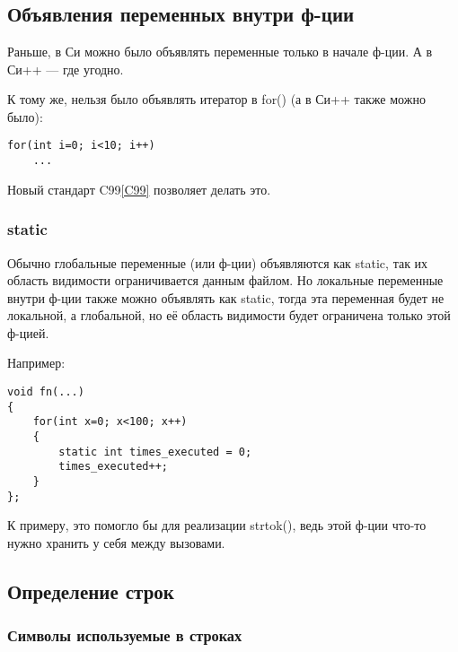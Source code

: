 ﻿\section{}
\subsection{Объявления переменных внутри ф-ции}

Раньше, в Си можно было объявлять переменные только в начале ф-ции. А в Си++ --- где угодно.

К тому же, нельзя было объявлять итератор в for() (а в Си++ также можно было):

\begin{lstlisting}
for(int i=0; i<10; i++)
	...
\end{lstlisting}

Новый стандарт C99\ref{C99} позволяет делать это.

\subsubsection{static}

Обычно глобальные переменные (или ф-ции) объявляются как static, так их область видимости ограничивается 
данным файлом. Но локальные переменные внутри ф-ции также можно объявлять как static, тогда эта переменная
будет не локальной, а глобальной, но её область видимости будет ограничена только этой ф-цией.

Например:

\begin{lstlisting}
void fn(...)
{
	for(int x=0; x<100; x++)
	{
		static int times_executed = 0;
		times_executed++;
	}
};
\end{lstlisting}

К примеру, это помогло бы для реализации strtok(), ведь этой ф-ции что-то нужно хранить у себя между вызовами.


\subsection{Определение строк}

\subsubsection{Символы используемые в строках}

